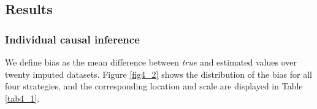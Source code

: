 	
	\subsection{Results}
	\label{sec:4.5.2}
	\subsubsection{Individual causal inference}
	We define bias as the mean difference between \emph{true} and estimated values over twenty imputed datasets. Figure \ref{fig4_2} shows the distribution of the bias for all four strategies, and the corresponding location and scale are displayed in Table \ref{tab4_1}.  
\begin{figure}[ht!]
	\begin{center}
\end{center}
\end{figure}
